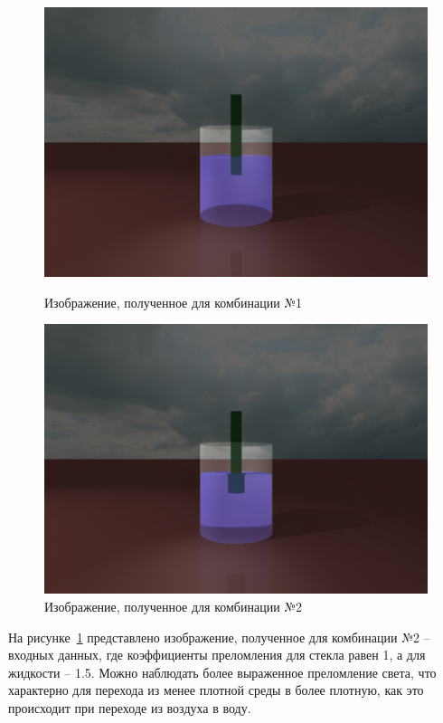 \begin{figure}[ht!]
	\begin{center}
		\begin{minipage}{0.45\textwidth}
			\centering
			\includegraphics[scale=0.2]{img/example-1.png}
			\caption{Изображение, полученное для комбинации №1}
			\label{c1}
		\end{minipage}\hfill
		\begin{minipage}{0.45\textwidth}
			\centering
			\includegraphics[scale=0.2]{img/example-2.png}
			\caption{Изображение, полученное для комбинации №2}
			\label{c2}
		\end{minipage}
	\end{center}
\end{figure}

На рисунке~\ref{c2} представлено изображение, полученное для комбинации №2 -- входных данных, где коэффициенты преломления для стекла равен 1, а для жидкости -- 1.5. Можно наблюдать более выраженное преломление света, что характерно для перехода из менее плотной среды в более плотную, как это происходит при переходе из воздуха в воду.

